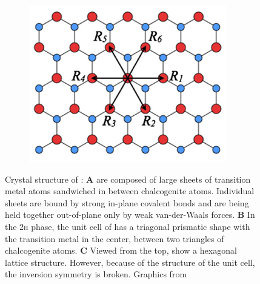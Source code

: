 \begin{figure}[t]
\begin{subfigure}{0.30\textwidth}
		\label{crystal2}
	\end{subfigure}
	\begin{subfigure}{0.30\textwidth}
		\centering
		\caption{}
		\includegraphics[height=.9\textwidth,right]{topview}
		\label{crystal3}
	\end{subfigure}
	\caption{Crystal structure of \tmds\!: \textbf{A} \tmds are composed of large sheets of transition metal atoms sandwiched in between chalcogenite atoms. Individual sheets are bound by strong in-plane covalent bonds and are being held together out-of-plane only by weak van-der-Waals forces. \textbf{B} In the 2\textsc{h} phase, the unit cell of \tmds has a triagonal prismatic shape with the transition metal in the center, between two triangles of chalcogenite atoms. \textbf{C} Viewed from the top, \tmds show a hexagonal lattice structure. However, because of the structure of the unit cell, the inversion symmetry is broken. Graphics from\cite{wang_electronics_2012, xiao_coupled_2012}}\label{crystal}
\end{figure}

